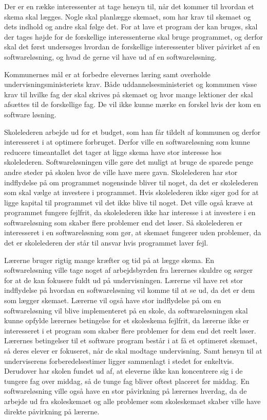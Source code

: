 Der er en række interessenter at tage hensyn til, når det kommer til hvordan et skema skal lægges. Nogle skal planlægge skemaet, som har krav til skemaet og dets indhold og andre skal følge det. For at lave et program der kan bruges, skal der tages højde for de forskellige interessenterne skal bruge programmet, og derfor skal det først undersøges hvordan de forskellige interessenter bliver påvirket af en softwareløsning, og hvad de gerne vil have ud af en softwareløsning. 


Kommunernes mål er at forbedre elevernes læring samt overholde undervisningsministeriets krav. Både uddannelsesministeriet og kommunen visse krav til hvilke fag der skal skrives på skemaet og hvor mange lektioner der skal afsættes til de forskellige fag. De vil ikke kunne mærke en forskel hvis der kom en software løsning.


Skolelederen arbejde ud for et budget, som han får tildelt af kommunen og derfor interesseret i at optimere forbruget. Derfor ville en softwareløsning som kunne reducere timeantallet det tager at ligge skema have stor interesse hos skolelederen. Softwareløsningen ville gøre det muligt at bruge de sparede penge andre steder på skolen hvor de ville have mere gavn. Skolelederen har stor indflydelse på om programmet nogensinde bliver til noget, da det er skolelederen som skal vælge at investere i programmet. Hvis skolelederen ikke siger god for at ligge kapital til programmet vil det ikke blive til noget. Det ville også kræve at programmet fungere fejlfrit, da skolelederen ikke har interesse i at investere i en softwareløsning som skaber flere problemer end det løser. Så skolelederen er interesseret i en softwareløsning som gør, at skemaet fungerer uden problemer, da det er skolelederen der står til ansvar hvis programmet laver fejl.


Lærerne bruger rigtig mange kræfter og tid på at lægge skema. En softwareløsning ville tage noget af arbejdsbyrden fra lærernes skuldre og sørger for at de kan fokusere fuldt ud på undervisningen. Lærerne vil have ret stor indflydelse på hvordan en softwareløsning vil komme til at se ud, da det er dem som lægger skemaet. Lærerne vil også have stor indflydelse på om en softwareløsning vil blive implementeret på en skole, da softwareløsningen skal kunne opfylde lærernes betingelse for et skoleskema fejlfrit, da lærerne ikke er interesseret i et program som skaber flere problemer for dem end det reelt løser. Lærernes betingelser til et software program består i at få et optimeret skemaet, så deres elever er fokuseret, når de skal modtage undervisning. Samt hensyn til at underviserens forberedelsestimer ligger sammenlagt i stedet for enkeltvis. Derudover har skolen fundet ud af, at eleverne ikke kan koncentrere sig i de tungere fag over middag, så de tunge fag bliver oftest placeret før middag. En softwareløsning ville også have en stor påvirkning på lærernes hverdag, da de arbejde ud fra skoleskemaet og alle problemer som skoleskemaet skaber ville have direkte påvirkning på lærerne.


